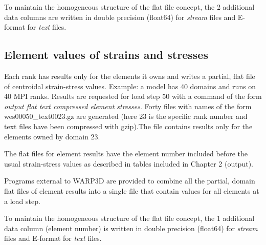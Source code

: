 \documentclass[10pt]{report}
\numberwithin{equation}{section}
\newcommand{\ti}{\emph}
\begin{document}
To maintain the homogeneous structure of the flat file concept, the 2 additional data columns are 
written in double precision (float64) for \ti{stream} files and E-format for \ti{text} files.

\subsection{Element values of strains and stresses}
Each rank has results only for the elements it owns and writes a partial, flat file of centroidal strain-stress 
values. Example: a model has 40 domains and runs on 40 MPI ranks.  Results are requested for load step 50 with a
command of the form \ti{output flat text compressed element stresses}. Forty files with names of the form
wes00050\_text0023.gz  are generated (here 23 is the specific rank number and text files 
have been compressed with gzip).The file contains results only for the elements owned by domain 23. 

The flat files for element results have the element number included before the usual strain-stress
values as described in tables included in Chapter 2 (output). 

Programs external to WARP3D are provided to combine all the partial, domain flat files of
element results into a single file that contain values for all elements at a load step.

To maintain the homogeneous structure of the flat file concept, the 1 
additional data column (element number) is 
written in double precision (float64) for \ti{stream} files and E-format for \ti{text} files.
\end{document}
